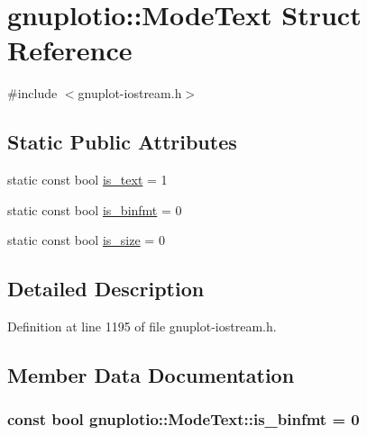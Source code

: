 \hypertarget{structgnuplotio_1_1_mode_text}{}\section{gnuplotio\+:\+:Mode\+Text Struct Reference}
\label{structgnuplotio_1_1_mode_text}


{\ttfamily \#include $<$gnuplot-\/iostream.\+h$>$}

\subsection*{Static Public Attributes}
\begin{DoxyCompactItemize}
\item 
static const bool \hyperlink{structgnuplotio_1_1_mode_text_a7083d8977c354a036a7c542bf99d3d52}{is\+\_\+text} = 1
\item 
static const bool \hyperlink{structgnuplotio_1_1_mode_text_a4c771363d894ae64d6af961ffde35126}{is\+\_\+binfmt} = 0
\item 
static const bool \hyperlink{structgnuplotio_1_1_mode_text_aaffc1e7bb26c6d1404cb5a3f03f13be9}{is\+\_\+size} = 0
\end{DoxyCompactItemize}


\subsection{Detailed Description}


Definition at line 1195 of file gnuplot-\/iostream.\+h.



\subsection{Member Data Documentation}
\subsubsection[{\texorpdfstring{is\+\_\+binfmt}{is_binfmt}}]{\setlength{\rightskip}{0pt plus 5cm}const bool gnuplotio\+::\+Mode\+Text\+::is\+\_\+binfmt = 0\hspace{0.3cm}{\ttfamily [static]}}\hypertarget{structgnuplotio_1_1_mode_text_a4c771363d894ae64d6af961ffde35126}{}\label{structgnuplotio_1_1_mode_text_a4c771363d894ae64d6af961ffde35126}


